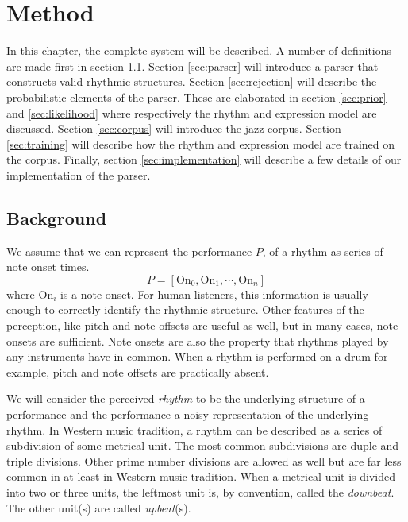 \chapter{Method}
\label{sec:method}

In this chapter, the complete system will be described. A number of definitions are made first in section \ref{sec:definitions}. Section \ref{sec:parser} will introduce a parser that constructs valid rhythmic structures. Section \ref{sec:rejection} will describe the probabilistic elements of the parser. These are elaborated in section \ref{sec:prior} and \ref{sec:likelihood} where respectively the rhythm and expression model are discussed. Section \ref{sec:corpus} will introduce the jazz corpus. Section \ref{sec:training} will describe how the rhythm and expression model are trained on the corpus. Finally, section \ref{sec:implementation} will describe a few details of our implementation of the parser.

\section{Background}
\label{sec:definitions}

We assume that we can represent the performance $P$, of a rhythm as series of note onset times. 
\begin{equation}
\label{eq:performance}
P = [\mathrm{On}_0, \mathrm{On}_1, \cdots, \mathrm{On}_n]
\end{equation}
where $\mathrm{On}_i$ is a note onset. For human listeners, this information is usually enough to correctly identify the rhythmic structure. Other features of the perception, like pitch and note offsets are useful as well, but in many cases, note onsets are sufficient. Note onsets are also the property that rhythms played by any instruments have in common. When a rhythm is performed on a drum for example, pitch and note offsets are practically absent.

We will consider the perceived \textit{rhythm} to be the underlying structure of a performance and the performance a noisy representation of the underlying rhythm. In Western music tradition, a rhythm can be described as a series of subdivision of some metrical unit. The most common subdivisions are duple and triple divisions. Other prime number divisions are allowed as well but are far less common in at least in Western music tradition. When a metrical unit is divided into two or three units, the leftmost unit is, by convention, called the \textit{downbeat}. The other unit(s) are called \textit{upbeat}(s).

